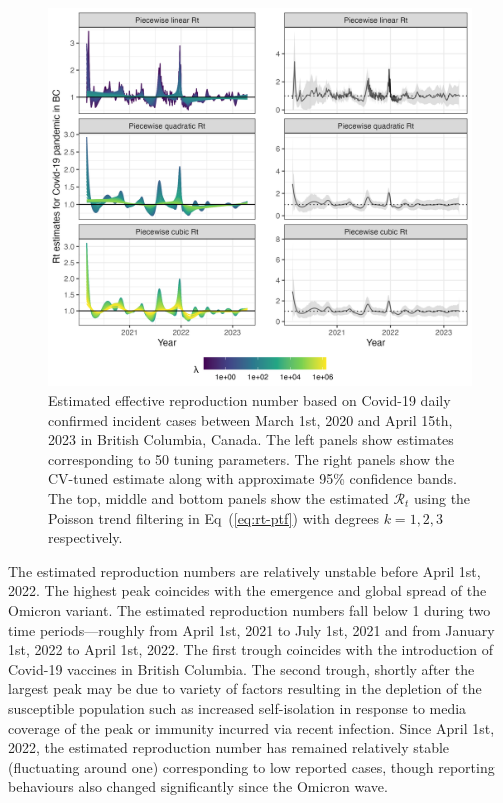 \documentclass[10pt,letterpaper]{article}
\def\calR{\mathcal{R}}
\renewcommand{\eqref}[1]{Eq~(\ref{#1})}
\begin{document}
\begin{figure}[!h]
  \centering
  \includegraphics[width=0.9\linewidth]{fig/covid_full_res.png}
  \caption{Estimated effective reproduction number based on Covid-19 daily
  confirmed incident cases between March 1st, 2020 and April 15th, 2023 in
  British Columbia, Canada. The left panels show estimates corresponding to 50
  tuning parameters. The right panels show the CV-tuned estimate along with
  approximate 95\% confidence bands. The top, middle and bottom panels show the
  estimated $\calR_t$ using the Poisson trend filtering in \eqref{eq:rt-ptf}
  with degrees $k=1,2,3$ respectively.} 
  \label{fig:covid-rt}
\end{figure} 

The estimated reproduction numbers are relatively unstable before April 1st,
2022. The highest peak coincides with the emergence and global spread of the
Omicron variant. The estimated reproduction numbers fall below 1 during two time
periods---roughly from April 1st, 2021 to July 1st, 2021 and from January 1st,
2022 to April 1st, 2022. The first trough coincides with the introduction of
Covid-19 vaccines in British Columbia. The second trough, shortly after the
largest peak may be due to variety of factors resulting in the depletion of the
susceptible population such as increased self-isolation in response to media
coverage of the peak or immunity incurred via recent infection. Since April 1st,
2022, the estimated reproduction number has remained relatively stable
(fluctuating around one) corresponding to low reported cases, though reporting
behaviours also changed significantly since the Omicron wave. 
\end{document}

